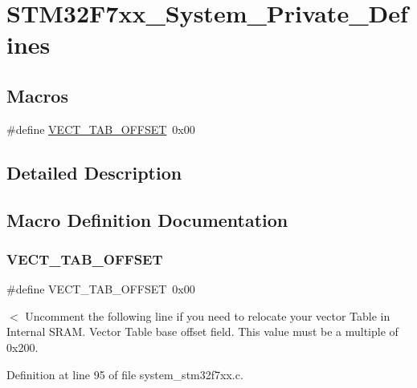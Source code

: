 \hypertarget{group__STM32F7xx__System__Private__Defines}{}\section{S\+T\+M32\+F7xx\+\_\+\+System\+\_\+\+Private\+\_\+\+Defines}
\label{group__STM32F7xx__System__Private__Defines}
\subsection*{Macros}
\begin{DoxyCompactItemize}
\item 
\#define \mbox{\hyperlink{group__STM32F7xx__System__Private__Defines_ga40e1495541cbb4acbe3f1819bd87a9fe}{V\+E\+C\+T\+\_\+\+T\+A\+B\+\_\+\+O\+F\+F\+S\+ET}}~0x00
\end{DoxyCompactItemize}


\subsection{Detailed Description}


\subsection{Macro Definition Documentation}
\mbox{\label{group__STM32F7xx__System__Private__Defines_ga40e1495541cbb4acbe3f1819bd87a9fe}} 
\subsubsection{\texorpdfstring{VECT\_TAB\_OFFSET}{VECT\_TAB\_OFFSET}}
{\footnotesize\ttfamily \#define V\+E\+C\+T\+\_\+\+T\+A\+B\+\_\+\+O\+F\+F\+S\+ET~0x00}

$<$ Uncomment the following line if you need to relocate your vector Table in Internal S\+R\+AM. Vector Table base offset field. This value must be a multiple of 0x200. 

Definition at line 95 of file system\+\_\+stm32f7xx.\+c.

